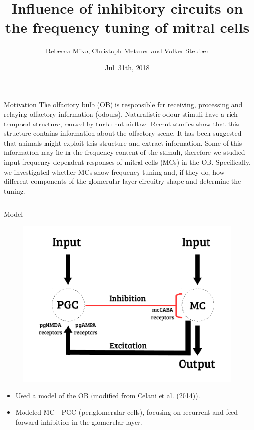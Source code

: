 \documentclass[final,hyperref={pdfpagelabels=false}]{beamer}
\title{Influence of inhibitory circuits on the frequency tuning of mitral cells}
\author[Miko]{Rebecca Miko, Christoph Metzner and Volker Steuber}
\institute{University of Hertfordshire, AL10 9AB, UK}
\date{Jul. 31th, 2018}
\begin{document}
\begin{frame}{} 
\begin{block}{Motivation}
The olfactory bulb (OB) is responsible for receiving, processing and relaying olfactory information (odours). 
Naturalistic odour stimuli have a rich temporal structure, caused by turbulent airflow.
Recent studies show that this structure contains information about the olfactory scene. 
It has been suggested that animals might exploit this structure and extract information. 
Some of this information may lie in the frequency content of the stimuli, therefore we studied input frequency dependent responses of mitral cells (MCs) in the OB.
Specifically, we investigated whether MCs show frequency tuning and, if they do, how different components of the glomerular layer circuitry  shape and determine the tuning.
\end{block}    

\begin{columns}[t]
\begin{column}{.48\linewidth}

\begin{block}{Model} 
\begin{figure}
\center
\includegraphics[scale=1.3]{images/Circuit_Diagram}
\end{figure}
\begin{itemize}
\item Used a model of the OB (modified from Celani et al. (2014)).
\item Modeled MC - PGC (periglomerular cells), focusing on recurrent and feed - forward inhibition in the glomerular layer.
\end{itemize}
\end{block}


\end{column}
\end{columns}
\end{frame}
\end{document}
